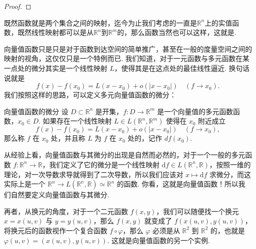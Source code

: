 \begin{proof}

\end{proof}

既然函数就是两个集合之间的映射，迄今为止我们考虑的一直是$\mathbb{R}^n$上的实值函数，既然线性映射都可以是从$\mathbb{R}^n$到$\mathbb{R}^m$的，那么函数当然也可以这样，这就是.

向量值函数只是只是对于函数到达空间的简单推广，甚至在一般的度量空间之间的映射的视角，这仅仅只是一个特例而已. 我们知道，对于一元函数与多元函数在某一点处的微分其实是一个线性映射 $L$，使得其是在这点处的最佳线性逼近. 换句话说就是\[f(x) - f(x_0) = L(x-x_0) + o(\vert x-x_0\vert)\quad (f\to x_0).\]我们按照这样的思路，可以定义多元向量值函数的微分：

\begin{definition}{向量值函数的微分}{}
    设 $D\subset\mathbb{R}^n$ 是开集，$f: D\to\mathbb{R}^m$ 是一个向量值的多元函数函数，$x_0\in D$. 如果存在一个线性映射 $L\in L(\mathbb{R}^n, \mathbb{R}^m)$ 使得在 $x_0$ 附近成立\[f(x) - f(x_0) = L(x-x_0) + o(\vert x-x_0\vert)\quad (f\to x_0),\]那么称 $f$ 在 $x_0$ 处，并且称 $L$ 为 $f$ 在 $x_0$ 处的，记作 $df(x_0)$.
\end{definition}

从经验上看，向量值函数与其微分的出现是自然而必然的，对于一个一般的多元函数 $f: \mathbb{R}^n\to \mathbb{R}$，我们定义了它的微分是一个线性映射 $\mathrm{d}f\in L(\mathbb{R}^n, \mathbb{R})$，按照一维的理论，对一次导数求导就得到了二次导数，所以我们应该对 $x \mapsto \mathrm{d}f$ 求微分，而这实际上是一个 $\mathbb{R}^n\to L(\mathbb{R^n},\mathbb{R})\simeq \mathbb{R}^n$ 的函数. 你看，这就是向量值函数！所以我们自然要定义向量值函数与其微分.

再者，从换元的角度，对于一个二元函数 $f(x, y)$，我们可以随便找一个换元 $x = x(u, v)$ 与 $y = y(u, v)$，那么 $f(x, y)$ 就变成了 $f(x(u, v), y(u, v))$，将换元后的函数视作一个复合函数 $f\circ \varphi$，那么 $\varphi$ 必须是从 $\mathbb{R}^2$ 到 $\mathbb{R}^2$ 的，也就是 $\varphi(u, v) = (x(u, v), y(u, v))$. 这就是向量值函数的另一个实例.

